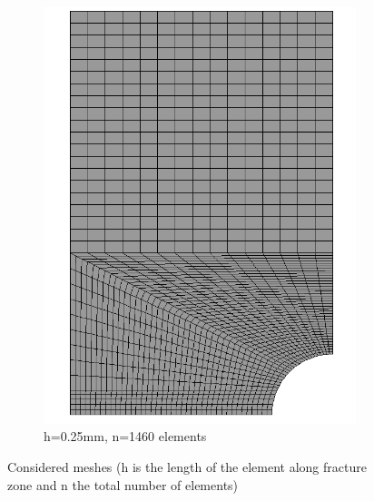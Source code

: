 \documentclass[a4paper,12pt,twoside]{report}
\begin{document}
\begin{figure}[htbp!]
\begin{subfigure}{0.27\textwidth}
         \includegraphics[width=1.27\textwidth]{25.0.25mm2.png}
         \caption{h=0.25mm, n=1460 elements}
         \label{fig:0.25mm}
     \end{subfigure}
    \caption{Considered meshes (h is the length of the element along fracture zone and n the total number of elements) }
    \label{fig:Considered meshes}
\end{figure}
\FloatBarrier
\end{document}
